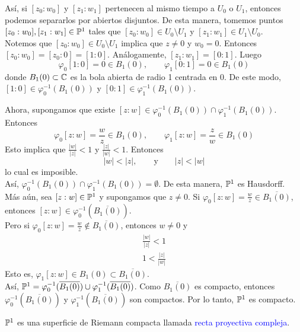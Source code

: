 \begin{example}
	Así, si $[z_0:w_0]$ y $[z_1:w_1]$ pertenecen al mismo tiempo a $U_0$ o $U_1$, entonces podemos separarlos por abiertos disjuntos.
	De esta manera, tomemos puntos $[z_0:w_0],[z_1:w_1]\in\mathbb{P}^1$ tales que $[z_0:w_0]\in U_0\setminus U_1$ y $[z_1:w_1]\in U_1\setminus U_0$.\\
	Notemos que $[z_0:w_0]\in U_0\setminus U_1$ implica que $z\neq 0$ y $w_0=0$. Entonces\\ $[z_0:w_0]=[z_0:0]=[1:0]$.
	Análogamente, $[z_1:w_1]=[0:1]$. Luego
	\begin{equation*}
		\varphi_0[1:0]=0\in B_1(0),\qquad \varphi_1[0:1]=0\in B_1(0)
	\end{equation*}
	donde $B_1(0)\subset \mathbb{C}$ es la bola abierta de radio 1 centrada en $0$. De este modo, $[1:0]\in \varphi
	_0^{-1}(B_1(0))$ y $[0:1]\in \varphi
	_1^{-1}(B_1(0))$.
	\begin{center}
	\end{center}
	Ahora, supongamos que existe $[z:w]\in\varphi_0^{-1}(B_1(0))\cap \varphi_1^{-1}(B_1(0))$. Entonces
	\begin{equation*}
		\varphi_0[z:w]=\frac{w}{z}\in B_1(0),\qquad \varphi_1[z:w]=\frac{z}{w}\in B_1(0) 
	\end{equation*}
	Esto implica que $\frac{|w|}{|z|}<1$ y $\frac{|z|}{|w|}<1$. Entonces
	\begin{equation*}
		|w|<|z|,\qquad\text{y}\qquad |z|<|w|
	\end{equation*}
	lo cual es imposible.\\
	Así, $\varphi_0^{-1}(B_1(0))\cap\varphi_1^{-1}(B_1(0))=\emptyset$. De esta manera, $\mathbb{P}^1$ es Hausdorff.\\
	Más aún, sea $[z:w]\in\mathbb{P}^1$ y supongamos que $z\neq 0$. Si $\varphi_0[z:w]=\frac{w}{z}\in \overline{B_1(0)}$, entonces $[z:w]\in\varphi_0^{-1}(\overline{B_1(0)})$.\\
	Pero si $\varphi_0[z:w]=\frac{w}{z}\not\in\overline {B_1(0)}$, entonces $w\neq 0$ y 
	\begin{align*}
		\frac{|w|}{|z|}<1\\
		1<\frac{|z|}{|w|}
	\end{align*}
	Esto es, $\varphi_1[z:w]\in B_1(0)\subset \overline{B_1(0)}$.\\
	Así, $\mathbb{P}^1=\varphi_0^{-1}(\overline{B_1(0)})\cup \varphi_1^{-1}(\overline{B_1(0)})$. Como $\overline{B_1(0)}$ es compacto, entonces $\varphi_0^{-1}(\overline{B_1(0)})$ y $\varphi_1^{-1}(\overline{B_1(0)})$ son compactos. Por lo tanto, $\mathbb{P}^1$ es compacto.\\
\end{example}
$\mathbb{P}^1$ es una superficie de Riemann compacta llamada \textcolor{blue}{recta proyectiva compleja}.

